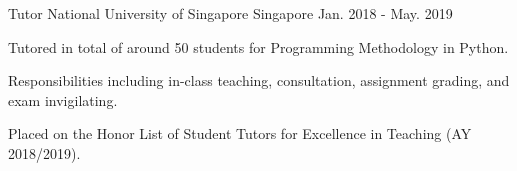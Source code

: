 

\begin{cventries}


  \cventry
    {Tutor} %
    {National University of Singapore} %
    {Singapore} %
    {Jan. 2018 - May. 2019} %
    {
      \begin{cvitems} %
        \item {Tutored in total of around 50 students for Programming Methodology in Python.}
        \item {Responsibilities including in-class teaching, consultation, assignment grading, and exam invigilating.}
        \item {Placed on the Honor List of Student Tutors for Excellence in Teaching (AY 2018/2019).}
      \end{cvitems}
    }

\end{cventries}
